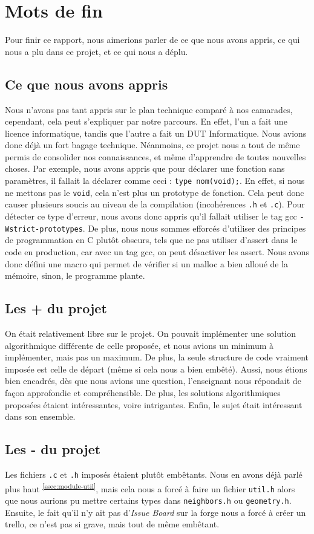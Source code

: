 \section{Mots de fin}
Pour finir ce rapport, nous aimerions parler de ce que nous avons appris, ce qui nous a plu dans ce projet, et ce qui nous a déplu.
\subsection{Ce que nous avons appris}
Nous n'avons pas tant appris sur le plan technique comparé à nos camarades,
cependant, cela peut s'expliquer par notre parcours. En effet, l'un a fait une licence informatique, tandis que l'autre a fait un DUT Informatique.
Nous avions donc déjà un fort bagage technique. Néanmoins, ce projet nous a tout de même permis de consolider nos connaissances,
et même d'apprendre de toutes nouvelles choses. Par exemple, nous avons appris que pour déclarer une fonction sans paramètres,
il fallait la déclarer comme ceci : \verb|type nom(void);|. En effet, si
nous ne mettons pas le \verb|void|, cela n'est plus un prototype de fonction.
Cela peut donc causer plusieurs soucis au niveau de la compilation (incohérences \verb|.h| et \verb|.c|).
Pour détecter ce type d'erreur, nous avons donc appris qu'il fallait utiliser le tag gcc \verb|-Wstrict-prototypes|.
De plus, nous nous sommes efforcés d'utiliser des principes de programmation en C plutôt obscurs,
tels que ne pas utiliser d'assert dans le code en production, car avec un tag gcc, on peut désactiver les assert.
Nous avons donc défini une macro qui permet de vérifier si un malloc a bien alloué de la mémoire, sinon, le programme plante.

\subsection{Les + du projet}
On était relativement libre sur le projet. On pouvait implémenter une solution algorithmique différente de celle proposée,
et nous avions un minimum à implémenter, mais pas un maximum. De plus, la seule structure de code vraiment imposée est
celle de départ (même si cela nous a bien embêté). Aussi, nous étions bien encadrés,
dès que nous avions une question, l'enseignant nous répondait de façon approfondie et compréhensible.
De plus, les solutions algorithmiques proposées étaient intéressantes, voire intrigantes.
Enfin, le sujet était intéressant dans son ensemble.

\subsection{Les - du projet}
Les fichiers \verb|.c| et \verb|.h| imposés étaient plutôt embêtants.
Nous en avons déjà parlé plus haut \textsuperscript{\ref{ssec:module-util}}, mais cela nous a forcé à faire un fichier 
\verb|util.h| alors que nous aurions pu mettre certains types dans 
\verb|neighbors.h| ou \verb|geometry.h|. Ensuite, le fait qu'il n'y ait pas 
d'\emph{Issue Board} sur la forge nous a forcé à créer un trello, ce n'est
pas si grave, mais tout de même embêtant.